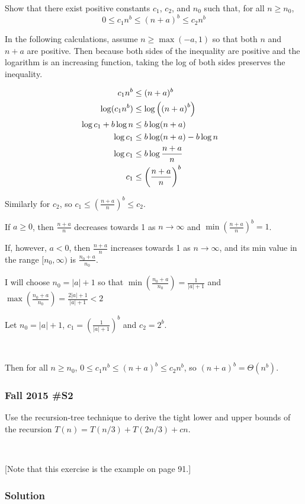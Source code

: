 Show that there exist positive constants $c_1$, $c_2$, and $n_0$ such that, for all $n \ge n_0$, $$0 \le c_1 n^b \le (n+a)^b \le c_2 n^b$$

In the following calculations, assume $n \ge \max(-a,1)$ so that both $n$ and $n+a$ are positive.  Then because both sides of the inequality are positive and the logarithm is an increasing function, taking the log of both sides preserves the inequality.  

\begin{align*}
	c_1 n^b &\le (n+a)^b \cr
	\log(c_1 n^b) &\le \log \left( \left(n+a\right)^b\right) \cr
	\log c_1 + b \log n &\le b \log (n+a) \cr
	\log c_1 &\le b \log (n+a) - b\log n \cr
	\log c_1 &\le b \log \frac{n+a}{n} \cr
	c_1 &\le \left( \frac{n+a}{n} \right)^b \cr		
\end{align*}

Similarly for $c_2$, so $\displaystyle c_1 \le \left( \frac{n+a}{n} \right)^b \le c_2$.  

If $a\ge 0$, then $\frac{n+a}{n}$ decreases towards 1 as $n \to \infty$ and $\min \left( \frac{n+a}{n} \right)^b=1$.  

If, however, $a<0$, then $\displaystyle\frac{n+a}{n}$ increases towards 1 as $n \to \infty$, and its min value in the range $[n_0, \infty)$ is $\displaystyle\frac{n_0+a}{n_0}$.  

I will choose $n_0 = |a|+1$ so that $\displaystyle\min \left(\frac{n_0+a}{n_0} \right) = \frac{1}{|a|+1}$ and $\displaystyle\max\left(\frac{n_0+a}{n_0} \right) = \frac{2|a|+1}{|a|+1} < 2$

Let $n_0 = |a|+1$,  $\displaystyle c_1 = \left(\frac{1}{|a|+1}\right)^b$ and $\displaystyle c_2 = 2^b$.  

\

Then for all $n \ge n_0$, $0 \le c_1 n^b \le (n+a)^b \le c_2n^b$, so $(n+a)^b = \Theta (n^b)$.  

\subsubsection{Fall 2015 \#S2}	
	Use the recursion-tree technique to derive the tight lower and upper bounds of the recursion $T(n) = T(n/3) + T(2n/3) + cn$.
	
\

[Note that this exercise is the example on page 91.]

\subsubsection{Solution}

